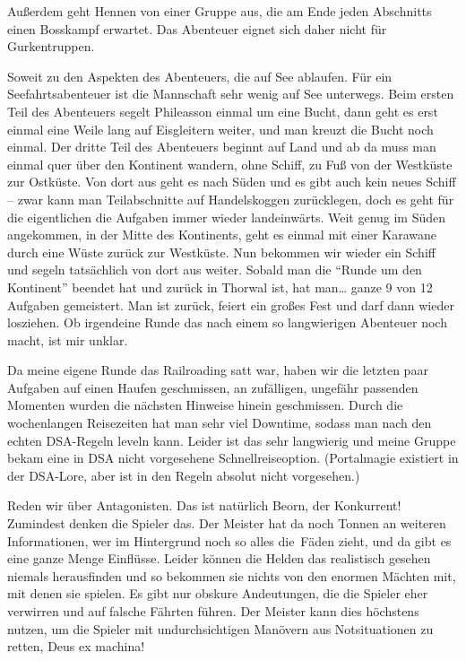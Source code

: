 \documentclass[final]{multiversum}
\begin{document}
Außerdem geht Hennen von einer Gruppe aus, die am Ende jeden Abschnitts einen
Bosskampf erwartet. Das Abenteuer eignet sich daher nicht für Gurkentruppen.

Soweit zu den Aspekten des Abenteuers, die auf See ablaufen. Für ein
Seefahrtsabenteuer ist die Mannschaft sehr wenig auf See unterwegs. Beim ersten
Teil des Abenteuers segelt Phileasson einmal um eine Bucht, dann geht es erst
einmal eine Weile lang auf Eisgleitern weiter, und man kreuzt die Bucht noch
einmal. Der dritte Teil des Abenteuers beginnt auf Land und ab da muss man
einmal quer über den Kontinent wandern, ohne Schiff, zu Fuß von der Westküste
zur Ostküste. Von dort aus geht es nach Süden und es gibt auch kein neues Schiff
-- zwar kann man Teilabschnitte auf Handelskoggen zurücklegen, doch es geht für
die eigentlichen die Aufgaben immer wieder landeinwärts. Weit genug im Süden
angekommen, in der Mitte des Kontinents, geht es einmal mit einer Karawane durch
eine Wüste zurück zur Westküste. Nun bekommen wir wieder ein Schiff und segeln
tatsächlich von dort aus weiter. Sobald man die \enquote{Runde um den Kontinent}
beendet hat und zurück in Thorwal ist, hat man\dots{} ganze 9 von 12 Aufgaben
gemeistert. Man ist zurück, feiert ein großes Fest und darf dann wieder
losziehen. Ob irgendeine Runde das nach einem so langwierigen Abenteuer noch
macht, ist mir unklar.

Da meine eigene Runde das Railroading satt war, haben wir die letzten paar
Aufgaben auf einen Haufen geschmissen, an zufälligen, ungefähr passenden
Momenten wurden die nächsten Hinweise hinein geschmissen. Durch die wochenlangen
Reisezeiten hat man sehr viel Downtime, sodass man nach den echten DSA-Regeln
leveln kann. Leider ist das sehr langwierig und meine Gruppe bekam eine in DSA
nicht vorgesehene Schnellreiseoption. (Portalmagie existiert in der DSA-Lore,
aber ist in den Regeln absolut nicht vorgesehen.)

Reden wir über Antagonisten. Das ist natürlich Beorn, der Konkurrent! Zumindest
denken die Spieler das. Der Meister hat da noch Tonnen an weiteren
Informationen, wer im Hintergrund noch so alles die~Fäden zieht, und da gibt es
eine ganze Menge Einflüsse. Leider können die Helden das realistisch gesehen
niemals herausfinden und so bekommen sie nichts von den enormen Mächten mit, mit
denen sie spielen. Es gibt nur obskure Andeutungen, die die Spieler eher
verwirren und auf falsche Fährten führen. Der Meister kann dies höchstens
nutzen, um die Spieler mit undurchsichtigen Manövern aus Notsituationen zu
retten, Deus ex machina!
\end{document}
